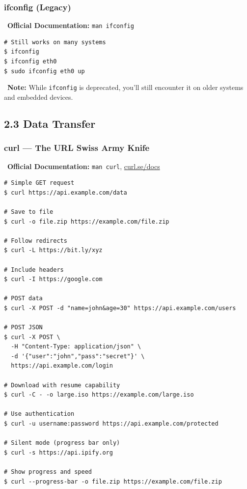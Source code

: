 \documentclass[12pt]{article}
\newcommand{\bookicon}{\faBook}
\begin{document}
\subsubsection*{ifconfig (Legacy)}

\begin{infobox}
\bookicon\ \textbf{Official Documentation:} \texttt{man ifconfig}
\end{infobox}

\begin{highlightbox}
\begin{verbatim}
# Still works on many systems
$ ifconfig
$ ifconfig eth0
$ sudo ifconfig eth0 up
\end{verbatim}
\end{highlightbox}

\begin{infobox}
\faInfoCircle\ \textbf{Note:} While \texttt{ifconfig} is deprecated, you'll still encounter it on older systems and embedded devices.
\end{infobox}

\subsection*{2.3 Data Transfer}

\subsubsection*{curl — The URL Swiss Army Knife}

\begin{infobox}
\bookicon\ \textbf{Official Documentation:} \texttt{man curl}, \href{https://curl.se/docs/}{curl.se/docs}
\end{infobox}

\begin{highlightbox}
\begin{verbatim}
# Simple GET request
$ curl https://api.example.com/data

# Save to file
$ curl -o file.zip https://example.com/file.zip

# Follow redirects
$ curl -L https://bit.ly/xyz

# Include headers
$ curl -I https://google.com

# POST data
$ curl -X POST -d "name=john&age=30" https://api.example.com/users

# POST JSON
$ curl -X POST \
  -H "Content-Type: application/json" \
  -d '{"user":"john","pass":"secret"}' \
  https://api.example.com/login

# Download with resume capability
$ curl -C - -o large.iso https://example.com/large.iso

# Use authentication
$ curl -u username:password https://api.example.com/protected

# Silent mode (progress bar only)
$ curl -s https://api.ipify.org

# Show progress and speed
$ curl --progress-bar -o file.zip https://example.com/file.zip
\end{verbatim}
\end{highlightbox}
\end{document}
